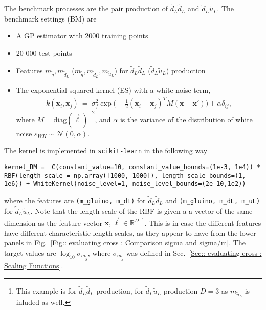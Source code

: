 \documentclass[twoside,english]{uiofysmaster}
\begin{document}
The benchmark processes are the pair production of $\tilde{d}_L \tilde{d}_L$ and $\tilde{d}_L \tilde{u}_L$. The benchmark settings (BM) are 
\begin{itemize}
\item A GP estimator with 2000 training points
\item 20 000 test points
\item Features $m_{\tilde{g}}, m_{\tilde{d}_L}$ ($m_{\tilde{g}}, m_{\tilde{d}_L}, m_{\tilde{u}_L}$) for $\tilde{d}_L \tilde{d}_L$ ($\tilde{d}_L \tilde{u}_L$) production
\item The exponential squared kernel (ES) with a white noise term, 
\begin{align}
k(\textbf{x}_i, \textbf{x}_j)~=~\sigma_f^2 \exp \big(-\frac{1}{2} (\textbf{x}_i-\textbf{x}_j)^TM(\textbf{x} - \textbf{x}') \big) + \alpha \delta_{ij},
\end{align}
where $M = \textrm{diag}(\vec{\ell})^{-2}$, and $\alpha$ is the variance of the distribution of white noise $\varepsilon_{WK} \sim \mathcal{N}(0, \alpha)$.
\end{itemize}
The kernel is implemented in \verb|scikit-learn| in the following way 
\begin{lstlisting}
kernel_BM =  C(constant_value=10, constant_value_bounds=(1e-3, 1e4)) * RBF(length_scale = np.array([1000, 1000]), length_scale_bounds=(1, 1e6)) + WhiteKernel(noise_level=1, noise_level_bounds=(2e-10,1e2))
\end{lstlisting} 
where the features are \verb|(m_gluino, m_dL)| for $\tilde{d}_L \tilde{d}_L$ and \verb|(m_gluino, m_dL, m_uL)| for $\tilde{d}_L \tilde{u}_L$. Note that the length scale of the RBF is given a a vector of the same dimension as the feature vector $\textbf{x},\vec{\ell} \in \mathbb{R}^D$ \footnote{This example is for $\tilde{d}_L \tilde{d}_L$ production, for $\tilde{d}_L \tilde{u}_L$ production $D=3$ as $m_{\tilde{u}_L}$ is inluded as well.}. This is in case the different features have different characteristic length scales, as they appear to have from the lower panels in Fig.~\ref{Fig:: evaluating cross : Comparison sigma and sigma/m}. The target values are $\log_{10} \sigma_{m_{\tilde{g}}}$, where $\sigma_{m_{\tilde{g}}}$ was defined in Sec.~\ref{Sec:: evaluating cross : Scaling Functions}.
\end{document}
